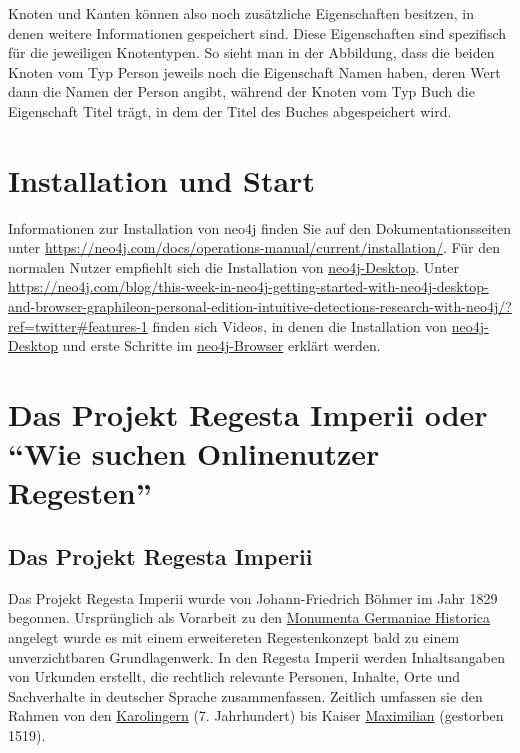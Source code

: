 \documentclass[ngerman,]{scrreprt}
\begin{document}
Knoten und Kanten können also noch zusätzliche Eigenschaften besitzen, in denen weitere Informationen gespeichert sind. Diese Eigenschaften sind spezifisch für die jeweiligen Knotentypen. So sieht man in der Abbildung, dass die beiden Knoten vom Typ Person jeweils noch die Eigenschaft Namen haben, deren Wert dann die Namen der Person angibt, während der Knoten vom Typ Buch die Eigenschaft Titel trägt, in dem der Titel des Buches abgespeichert wird.

\chapter{Installation und Start}\label{installation-und-start}

Informationen zur Installation von neo4j finden Sie auf den Dokumentationsseiten unter \url{https://neo4j.com/docs/operations-manual/current/installation/}. Für den normalen Nutzer empfiehlt sich die Installation von \href{https://neo4j.com/download/}{neo4j-Desktop}. Unter \url{https://neo4j.com/blog/this-week-in-neo4j-getting-started-with-neo4j-desktop-and-browser-graphileon-personal-edition-intuitive-detections-research-with-neo4j/?ref=twitter\#features-1} finden sich Videos, in denen die Installation von \href{https://www.youtube.com/watch?v=8yWhuUnPapw}{neo4j-Desktop} und erste Schritte im \href{https://www.youtube.com/watch?v=rQTximyaETA}{neo4j-Browser} erklärt werden.

\chapter{\texorpdfstring{Das Projekt Regesta Imperii oder ``Wie suchen Onlinenutzer Regesten''}{Das Projekt Regesta Imperii oder Wie suchen Onlinenutzer Regesten}}\label{das-projekt-regesta-imperii-oder-wie-suchen-onlinenutzer-regesten}

\section{Das Projekt Regesta Imperii}\label{das-projekt-regesta-imperii}

Das Projekt Regesta Imperii wurde von Johann-Friedrich Böhmer im Jahr 1829 begonnen. Ursprünglich als Vorarbeit zu den \href{https://www.mgh.de}{Monumenta Germaniae Historica} angelegt wurde es mit einem erweitereten Regestenkonzept bald zu einem unverzichtbaren Grundlagenwerk. In den Regesta Imperii werden Inhaltsangaben von Urkunden erstellt, die rechtlich relevante Personen, Inhalte, Orte und Sachverhalte in deutscher Sprache zusammenfassen. Zeitlich umfassen sie den Rahmen von den \href{https://de.wikipedia.org/wiki/Karolinger}{Karolingern} (7. Jahrhundert) bis Kaiser \href{https://de.wikipedia.org/wiki/Maximilian_I._(HRR)}{Maximilian} (gestorben 1519).
\end{document}

